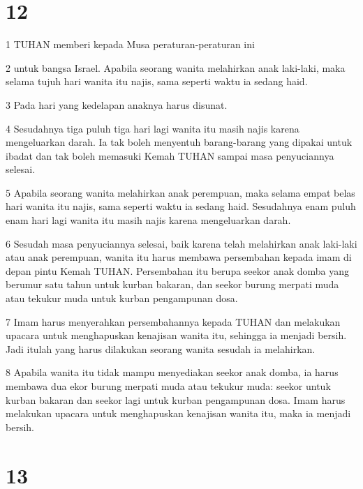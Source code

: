\chapter{12}

\par 1 TUHAN memberi kepada Musa peraturan-peraturan ini
\par 2 untuk bangsa Israel. Apabila seorang wanita melahirkan anak laki-laki, maka selama tujuh hari wanita itu najis, sama seperti waktu ia sedang haid.
\par 3 Pada hari yang kedelapan anaknya harus disunat.
\par 4 Sesudahnya tiga puluh tiga hari lagi wanita itu masih najis karena mengeluarkan darah. Ia tak boleh menyentuh barang-barang yang dipakai untuk ibadat dan tak boleh memasuki Kemah TUHAN sampai masa penyuciannya selesai.
\par 5 Apabila seorang wanita melahirkan anak perempuan, maka selama empat belas hari wanita itu najis, sama seperti waktu ia sedang haid. Sesudahnya enam puluh enam hari lagi wanita itu masih najis karena mengeluarkan darah.
\par 6 Sesudah masa penyuciannya selesai, baik karena telah melahirkan anak laki-laki atau anak perempuan, wanita itu harus membawa persembahan kepada imam di depan pintu Kemah TUHAN. Persembahan itu berupa seekor anak domba yang berumur satu tahun untuk kurban bakaran, dan seekor burung merpati muda atau tekukur muda untuk kurban pengampunan dosa.
\par 7 Imam harus menyerahkan persembahannya kepada TUHAN dan melakukan upacara untuk menghapuskan kenajisan wanita itu, sehingga ia menjadi bersih. Jadi itulah yang harus dilakukan seorang wanita sesudah ia melahirkan.
\par 8 Apabila wanita itu tidak mampu menyediakan seekor anak domba, ia harus membawa dua ekor burung merpati muda atau tekukur muda: seekor untuk kurban bakaran dan seekor lagi untuk kurban pengampunan dosa. Imam harus melakukan upacara untuk menghapuskan kenajisan wanita itu, maka ia menjadi bersih.

\chapter{13}

